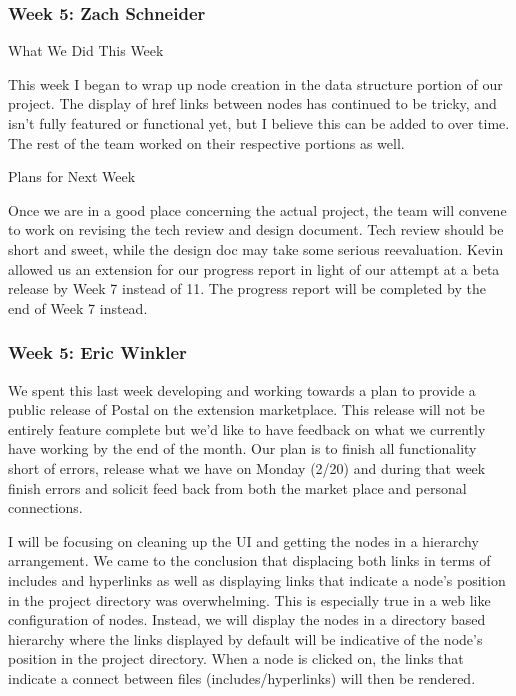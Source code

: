  \subsubsection{Week 5: Zach Schneider}

What We Did This Week

This week I began to wrap up node creation in the data structure portion of our project. The display of href links between nodes has continued to be tricky, and isn't fully featured or functional yet, but I believe this can be added to over time. The rest of the team worked on their respective portions as well.



Plans for Next Week

Once we are in a good place concerning the actual project, the team will convene to work on revising the tech review and design document. Tech review should be short and sweet, while the design doc may take some serious reevaluation. Kevin allowed us an extension for our progress report in light of our attempt at a beta release by Week 7 instead of 11. The progress report will be completed by the end of Week 7 instead. \\ 

 \subsubsection{Week 5: Eric Winkler}

We spent this last week developing and working towards a plan to provide a public release of Postal on the extension marketplace. This release will not be entirely feature complete but we'd like to have feedback on what we currently have working by the end of the month. Our plan is to finish all functionality short of errors, release what we have on Monday (2/20) and during that week finish errors and solicit feed back from both the market place and personal connections. 



I will be focusing on cleaning up the UI and getting the nodes in a hierarchy arrangement. We came to the conclusion that displacing both links in terms of includes and hyperlinks as well as displaying links that indicate a node's position in the project directory was overwhelming. This is especially true in a web like configuration of nodes. Instead, we will display the nodes in a directory based hierarchy where the links displayed by default will be indicative of the node's position in the project directory. When a node is clicked on, the links that indicate a connect between files (includes/hyperlinks) will then be rendered. \\ 

